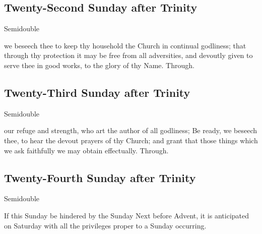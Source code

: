 \subsection{Twenty-Second Sunday after Trinity}
\begin{inhead}
{Semidouble}
\end{inhead}



\collect
{} we beseech thee to keep thy household the Church in continual godliness; that through thy protection it may be free from all adversities, and devoutly given to serve thee in good works, to the glory of thy Name. Through.


\subsection{Twenty-Third Sunday after Trinity}
\begin{inhead}
{Semidouble}
\end{inhead}



\collect
{} our refuge and strength, who art the author of all godliness; Be ready, we beseech thee, to hear the devout prayers of thy Church; and grant that those things which we ask faithfully we may obtain effectually. Through.

\subsection{Twenty-Fourth Sunday after Trinity}
\begin{inhead}
{Semidouble}
\end{inhead}
\begin{rubric}
If this Sunday be hindered by the Sunday Next before Advent, it is anticipated on Saturday with all the privileges proper to a Sunday occurring.
\end{rubric}

